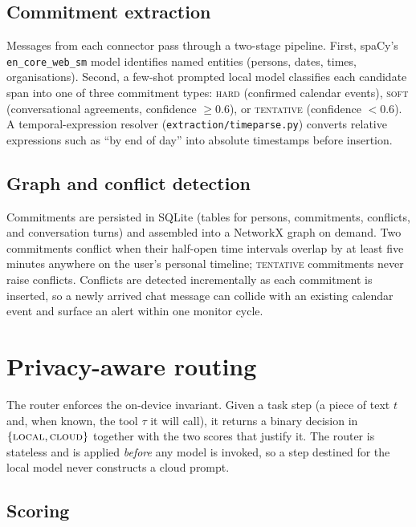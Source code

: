 \documentclass{ecai}
\begin{document}
\subsection{Commitment extraction}

Messages from each connector pass through a two-stage pipeline. First, spaCy's
\texttt{en\_core\_web\_sm} model \citep{spacy2020} identifies named entities
(persons, dates, times, organisations). Second, a few-shot prompted local model
classifies each candidate span into one of three commitment types: \textsc{hard}
(confirmed calendar events), \textsc{soft} (conversational agreements, confidence
$\geq 0.6$), or \textsc{tentative} (confidence $<0.6$). A temporal-expression
resolver (\texttt{extraction/timeparse.py}) converts relative expressions such as
``by end of day'' into absolute timestamps before insertion.

\subsection{Graph and conflict detection}

Commitments are persisted in SQLite (tables for persons, commitments, conflicts,
and conversation turns) and assembled into a NetworkX graph on demand. Two
commitments conflict when their half-open time intervals overlap by at least five
minutes anywhere on the user's personal timeline; \textsc{tentative} commitments
never raise conflicts. Conflicts are detected incrementally as each commitment is
inserted, so a newly arrived chat message can collide with an existing calendar
event and surface an alert within one monitor cycle.


\section{Privacy-aware routing}\label{sec:routing}

The router enforces the on-device invariant. Given a task step (a piece of text
$t$ and, when known, the tool $\tau$ it will call), it returns a binary decision
in $\{\textsc{local}, \textsc{cloud}\}$ together with
the two scores that justify it. The router is stateless and is applied
\emph{before} any model is invoked, so a step destined for the local model never
constructs a cloud prompt.

\subsection{Scoring}
\end{document}

